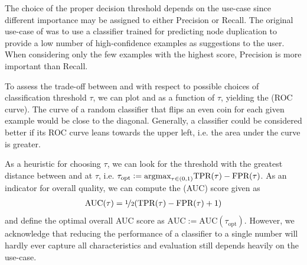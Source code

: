 \documentclass[
	fontsize=10pt, %
	twoside=false, %
	secnumdepth=1, %
  toc=indentunnumbered %
]{kaobook}
\begin{document}
The choice of the proper decision threshold
depends on the use-case since different importance may be assigned
to either Precision or Recall.
%
The original use-case of \nielsen was to use a classifier trained for predicting
node duplication to provide a low number of high-confidence examples as
suggestions to the user. When considering only the few examples with the highest
score, Precision is more important than Recall.

To assess the trade-off between \FPR and \TPR with respect to possible choices of
classification threshold $\tau$, we can plot \FPR and \TPR as a function of
$\tau$, yielding the  (ROC curve). The
curve of a random classifier that flips an even coin for each given example would
be close to the diagonal. 
%
Generally, a classifier could be considered better if its ROC curve leans
towards the upper left, i.e. the area under the curve is greater.

As a heuristic for choosing $\tau$, we can look for the threshold with the greatest
distance between \TPR and \FPR at $\tau$, i.e. $\tau_{\text{opt}} := \argmax_{\tau \in
  (0,1)} \TPR(\tau) - \FPR(\tau)$.
As an indicator for overall quality, we can compute the 
(AUC) score given as
\begin{align*}
  \text{AUC}(\tau) = \nicefrac{1}{2} (\TPR(\tau) - \FPR(\tau) + 1)
\end{align*}
and define the optimal overall AUC score as $\text{AUC} := \text{AUC}(\tau_{\text{opt}})$.
However, we acknowledge that reducing the performance of a classifier to a
single number will hardly ever capture all characteristics and evaluation still
depends heavily on the use-case.



\end{document}
